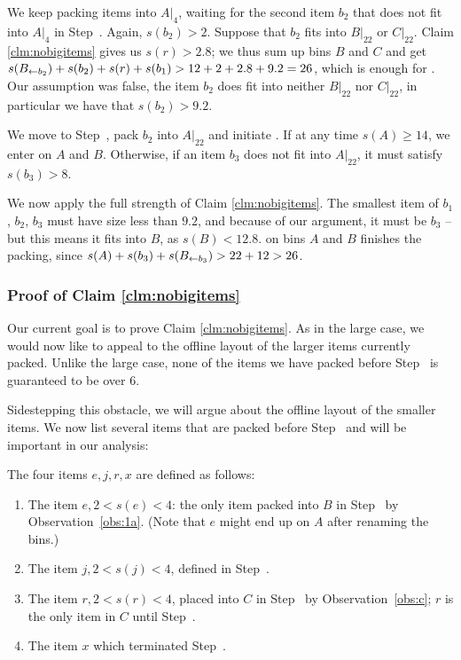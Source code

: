 We keep packing items into $A|_{4}$, waiting for the second item $b_2$
that does not fit into $A|_4$ in Step~. Again, $s(b_2) >
2$. Suppose that $b_2$ fits into $B|_{22}$ or $C|_{22}$. Claim \ref{clm:nobigitems}
gives us $s(r)>2.8$; we thus sum up bins $B$ and $C$ and get $s(B_{\leftarrow b_2}) +
s(b_2) + s(r) + s(b_1) > 12 + 2 + 2.8 + 9.2 = 26$, which is enough for
.  Our assumption was false, the item $b_2$ does 
fit into neither $B|_{22}$ nor $C|_{22}$, in particular we have that $s(b_2)>9.2$.

We move to Step~, pack $b_2$ into $A|_{22}$ and initiate . If at any time $s(A) \ge  14$, we
enter  on $A$ and $B$. Otherwise, if an item $b_3$ does not fit into $A|_{22}$,
it must satisfy $s(b_3) > 8$.

We now apply the full strength of Claim \ref{clm:nobigitems}. The
smallest item of $b_1$, $b_2$, $b_3$ must have size less than $9.2$,
and because of our argument, it must be $b_3$ -- but this means it
fits into $B$, as $s(B)<12.8$.  on bins $A$ and $B$ finishes the
packing, since $s(A) + s(b_3) + s(B_{\leftarrow b_3}) > 22 + 12 > 26$.

\subsubsection{Proof of Claim \ref{clm:nobigitems}}\label{sec:profOfClaim}

Our current goal is to prove Claim \ref{clm:nobigitems}.
As in the large case, we would now like to appeal to the offline
layout of the larger items currently packed. Unlike the large case,
none of the items we have packed before Step~ is guaranteed to be over $6$.

Sidestepping this obstacle, we will argue about the offline layout of
the smaller items. We now list several items that are packed before Step~ and will be important in our analysis:

\begin{dfn}\label{dfn:fouritems} The four items $e,j,r,x$ are defined as follows:
\begin{enumerate}
\item The item $e, 2 < s(e) < 4$: the only item packed into $B$ in Step~{\rm {}}
by Observation~\ref{obs:1a}.
(Note that $e$ might end up on $A$ after renaming the bins.)
\item The item $j, 2 < s(j) < 4$, defined in Step~{\rm {}}.
\item The item $r, 2 < s(r) < 4$, placed into $C$ in Step~{\rm {}} by Observation~\ref{obs:c}; $r$ is the only item in $C$ until Step~{\rm {}}.
\item The item $x$ which terminated Step~{\rm {}}.
\end{enumerate}

\end{dfn}

